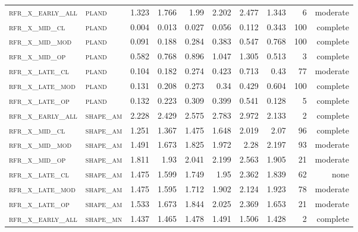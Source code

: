\begin{landscape}
\begin{center}
\begin{footnotesize}
\begin{longtable}{llrrrrr|rrr}
\textsc{rfr\_x\_early\_all} & \textsc{pland     }   & 1.323   & 1.766   & 1.99     & 2.202    & 2.477    & 1.343   & 6   & moderate \\
\textsc{rfr\_x\_mid\_cl   } & \textsc{pland     }   & 0.004   & 0.013   & 0.027    & 0.056    & 0.112    & 0.343   & 100 & complete \\
\textsc{rfr\_x\_mid\_mod  } & \textsc{pland     }   & 0.091   & 0.188   & 0.284    & 0.383    & 0.547    & 0.768   & 100 & complete \\
\textsc{rfr\_x\_mid\_op   } & \textsc{pland     }   & 0.582   & 0.768   & 0.896    & 1.047    & 1.305    & 0.513   & 3   & complete \\
\textsc{rfr\_x\_late\_cl  } & \textsc{pland     }   & 0.104   & 0.182   & 0.274    & 0.423    & 0.713    & 0.43    & 77  & moderate \\
\textsc{rfr\_x\_late\_mod } & \textsc{pland     }   & 0.131   & 0.208   & 0.273    & 0.34     & 0.429    & 0.604   & 100 & complete \\
\textsc{rfr\_x\_late\_op  } & \textsc{pland     }   & 0.132   & 0.223   & 0.309    & 0.399    & 0.541    & 0.128   & 5   & complete \\
\textsc{rfr\_x\_early\_all} & \textsc{shape\_am }   & 2.228   & 2.429   & 2.575    & 2.783    & 2.972    & 2.133   & 2   & complete \\
\textsc{rfr\_x\_mid\_cl   } & \textsc{shape\_am }   & 1.251   & 1.367   & 1.475    & 1.648    & 2.019    & 2.07    & 96  & complete \\
\textsc{rfr\_x\_mid\_mod  } & \textsc{shape\_am }   & 1.491   & 1.673   & 1.825    & 1.972    & 2.28     & 2.197   & 93  & moderate \\
\textsc{rfr\_x\_mid\_op   } & \textsc{shape\_am }   & 1.811   & 1.93    & 2.041    & 2.199    & 2.563    & 1.905   & 21  & moderate \\
\textsc{rfr\_x\_late\_cl  } & \textsc{shape\_am }   & 1.475   & 1.599   & 1.749    & 1.95     & 2.362    & 1.839   & 62  & none     \\
\textsc{rfr\_x\_late\_mod } & \textsc{shape\_am }   & 1.475   & 1.595   & 1.712    & 1.902    & 2.124    & 1.923   & 78  & moderate \\
\textsc{rfr\_x\_late\_op  } & \textsc{shape\_am }   & 1.533   & 1.673   & 1.844    & 2.025    & 2.369    & 1.653   & 21  & moderate \\
\textsc{rfr\_x\_early\_all} & \textsc{shape\_mn }   & 1.437   & 1.465   & 1.478    & 1.491    & 1.506    & 1.428   & 2   & complete \\

\end{longtable}
\end{footnotesize}
\end{center}
\end{landscape}
